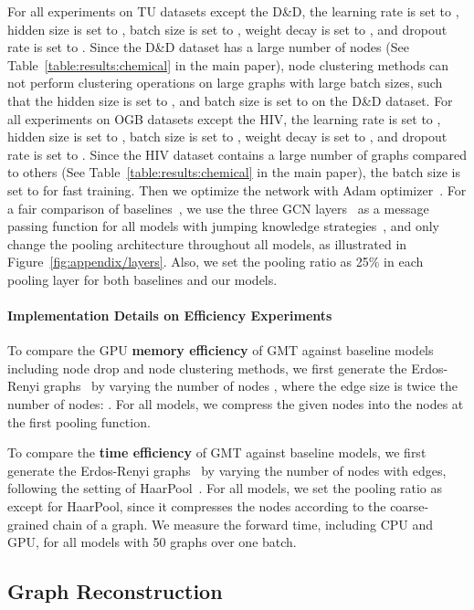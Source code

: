 \documentclass{article} \usepackage{iclr2021_conference,times}
\begin{document}
For all experiments on TU datasets except the D\&D, the learning rate is set to , hidden size is set to , batch size is set to , weight decay is set to , and dropout rate is set to . Since the D\&D dataset has a large number of nodes (See Table~\ref{table:results:chemical} in the main paper), node clustering methods can not perform clustering operations on large graphs with large batch sizes, such that the hidden size is set to , and batch size is set to  on the D\&D dataset. For all experiments on OGB datasets except the HIV, the learning rate is set to , hidden size is set to , batch size is set to , weight decay is set to , and dropout rate is set to . Since the HIV dataset contains a large number of graphs compared to others (See Table~\ref{table:results:chemical} in the main paper), the batch size is set to  for fast training. Then we optimize the network with Adam optimizer~\citep{kingma2014adam}. For a fair comparison of baselines~\citep{SAGPool}, we use the three GCN layers~\citep{GCN} as a message passing function for all models with jumping knowledge strategies~\citep{JumpingKnowledge}, and only change the pooling architecture throughout all models, as illustrated in Figure~\ref{fig:appendix/layers}. Also, we set the pooling ratio as 25\% in each pooling layer for both baselines and our models.

\paragraph{Implementation Details on Efficiency Experiments \label{appendix/classification/efficiency}}
To compare the GPU \textbf{memory efficiency} of GMT against baseline models including node drop and node clustering methods, we first generate the Erdos-Renyi graphs~\citep{randomgraph} by varying the number of nodes , where the edge size  is twice the number of nodes: . For all models, we compress the given  nodes into the  nodes at the first pooling function.

To compare the \textbf{time efficiency} of GMT against baseline models, we first generate the Erdos-Renyi graphs~\citep{randomgraph} by varying the number of nodes  with  edges, following the setting of HaarPool~\citep{HaarPool}. For all models, we set the pooling ratio as  except for HaarPool, since it compresses the nodes according to the coarse-grained chain of a graph. We measure the forward time, including CPU and GPU, for all models with 50 graphs over one batch.

\subsection{Graph Reconstruction \label{appendix/reconstruction/experimentaldetail}}
\end{document}
